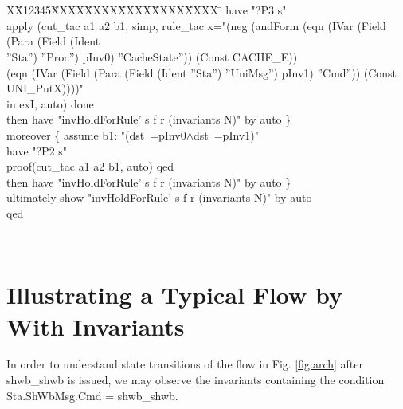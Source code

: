 \documentclass{llncs}
\newlength{\fminilength}
\newenvironment{fmini}[1][\linewidth]
  {\setlength{\fminilength}{#1\fboxsep-2\fboxrule}%
   \vspace{2ex}\noindent\begin{lrbox}{\fminibox}\begin{minipage}{\fminilength}%
   \mbox{ }\hfill\vspace{-2.5ex}}%
  {\end{minipage}\end{lrbox}\vspace{1ex}\hspace{0ex}%
   \framebox{\usebox{\fminibox}}}
\newenvironment{specification}
{\noindent\scriptsize
\tt\begin{fmini}\begin{tabbing}X\=X12345\=XXXX\=XXXX\=XXXX\=XXXX\=XXXX
\=\+\kill} {\end{tabbing}\normalfont\end{fmini}}
\def \twoSpaces {\ \ }
\def \twoSpaces {\ \ }
\begin{document}
\begin{specification}
  have "?P3 s"\\
  apply (cut\_tac a1 a2 b1, simp, rule\_tac x="(neg (andForm (eqn (IVar (Field (Para (Field (Ident\\
   ''Sta'') ''Proc'') pInv0) ''CacheState''))    (Const CACHE\_E)) \\
   (eqn (IVar (Field (Para (Field (Ident ''Sta'') ''UniMsg'') pInv1) ''Cmd'')) (Const UNI\_PutX))))" \\
   in exI, auto) done\\
  then have "invHoldForRule' s f r (invariants N)" by auto
\}\\
moreover \{
  assume b1: "(dst~=pInv0$\wedge$dst~=pInv1)"\\
  have "?P2 s"\\
  proof(cut\_tac a1 a2 b1, auto) qed\\
  then have "invHoldForRule' s f r (invariants N)" by auto
\}\\
ultimately show "invHoldForRule' s f r (invariants N)" by auto \twoSpaces \\ qed\\

\end{specification}\\


\vspace{-10pt}
\section{Illustrating a Typical Flow by With Invariants\label{sec:relatingWithFlow}}


In order to understand state transitions of the flow in Fig. \ref{fig:arch} after shwb\_shwb is issued, we may observe the invariants containing the condition Sta.ShWbMsg.Cmd = shwb\_shwb.
\end{document}
